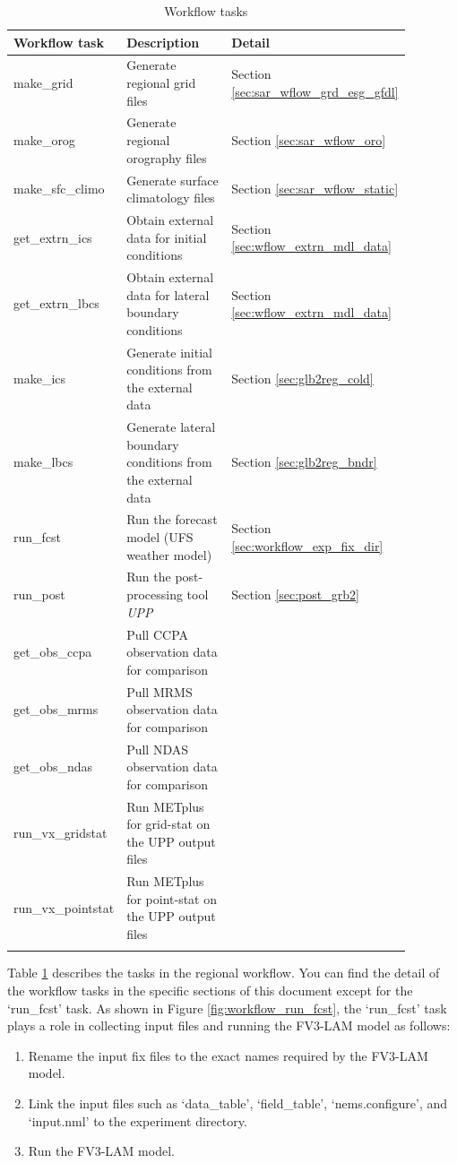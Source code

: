 \documentclass[11pt,fleqn]{report}              %
\begin{document}
{
\fontsize{10}{12}\selectfont
\begin{longtable}{p{0.15\linewidth} | p{0.6\linewidth}  | p{0.13\linewidth} }
\hline
\hline
 Workflow task & Description & Detail \\
\hline
make\_grid & Generate regional grid files & Section \ref{sec:sar_wflow_grd_esg_gfdl}  \\
make\_orog & Generate regional orography files & Section \ref{sec:sar_wflow_oro} \\
make\_sfc\_climo & Generate surface climatology files & Section \ref{sec:sar_wflow_static} \\
get\_extrn\_ics & Obtain external data for initial conditions &  Section \ref{sec:wflow_extrn_mdl_data} \\
get\_extrn\_lbcs & Obtain external data for lateral boundary conditions & Section \ref{sec:wflow_extrn_mdl_data} \\
make\_ics & Generate initial conditions from the external data & Section \ref{sec:glb2reg_cold} \\
make\_lbcs & Generate lateral boundary conditions from the external data & Section \ref{sec:glb2reg_bndr} \\
run\_fcst & Run the forecast model (UFS weather model) & Section \ref{sec:workflow_exp_fix_dir} \\
run\_post & Run the post-processing tool {\it UPP} & Section \ref{sec:post_grb2} \\
get\_obs\_ccpa & Pull CCPA observation data for comparison & \\
get\_obs\_mrms & Pull MRMS observation data for comparison & \\
get\_obs\_ndas & Pull NDAS observation data for comparison & \\
run\_vx\_gridstat & Run METplus for grid-stat on the UPP output files & \\
run\_vx\_pointstat & Run METplus for point-stat on the UPP output files & \\
\hline
\caption{Workflow tasks}
\label{table:wflow_tasks}
\end{longtable}
}

Table \ref{table:wflow_tasks} describes the tasks in the regional workflow. You can find the detail of the workflow tasks in the specific sections of this document except for the `run\_fcst' task. As shown in Figure \ref{fig:workflow_run_fcst}, the `run\_fcst' task plays a role in collecting input files and running the FV3-LAM model as follows:
\begin{enumerate}
\item Rename the input fix files to the exact names required by the FV3-LAM model.
\item Link the input files such as `data\_table', `field\_table', `nems.configure', and `input.nml' to the experiment directory.
\item Run the FV3-LAM model.
\end{enumerate}
\end{document}
